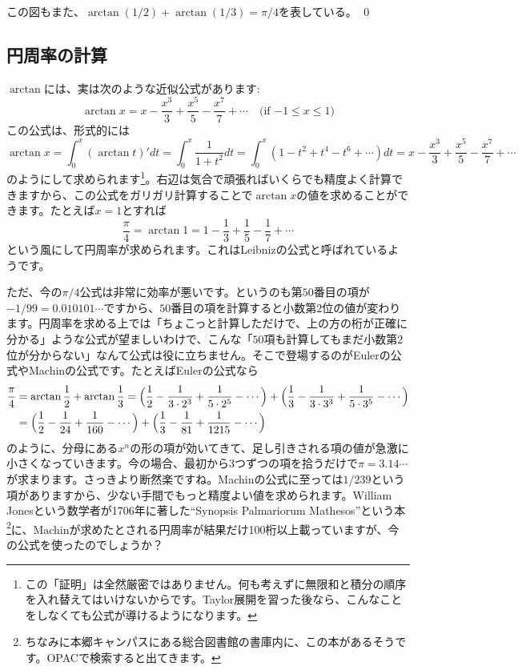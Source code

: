 この図もまた、$\arctan (1/2) + \arctan (1/3) = \pi/4$を表している。 \qed

\subsection{円周率の計算}

$\arctan$には、実は次のような近似公式があります:
\[
\arctan x = x - \frac{x^3}{3} + \frac{x^5}{5} - \frac{x^7}{7} + \cdots \quad \text{(if $-1\leq x\leq 1$)}
\]
この公式は、形式的には
\[
\arctan x = \int_0^x (\arctan t)' dt = \int_0^x \frac{1}{1+t^2} dt = \int_0^x (1-t^2+t^4-t^6+\cdots) dt
= x - \frac{x^3}{3} + \frac{x^5}{5} - \frac{x^7}{7} + \cdots
\]
のようにして求められます\footnote{この「証明」は全然厳密ではありません。何も考えずに無限和と積分の順序を入れ替えてはいけないからです。Taylor展開を習った後なら、こんなことをしなくても公式が導けるようになります。}。右辺は気合で頑張ればいくらでも精度よく計算できますから、この公式をガリガリ計算することで$\arctan x$の値を求めることができます。たとえば$x=1$とすれば
\[
\frac{\pi}{4} = \arctan 1 = 1 - \frac{1}{3} + \frac{1}{5} - \frac{1}{7} + \cdots
\]
という風にして円周率が求められます。これはLeibnizの公式と呼ばれているようです。

ただ、今の$\pi/4$公式は非常に効率が悪いです。というのも第$50$番目の項が$-1/99 = 0.010101\cdots$ですから、$50$番目の項を計算すると小数第$2$位の値が変わります。円周率を求める上では「ちょこっと計算しただけで、上の方の桁が正確に分かる」ような公式が望ましいわけで、こんな「$50$項も計算してもまだ小数第$2$位が分からない」なんて公式は役に立ちません。そこで登場するのがEulerの公式やMachinの公式です。たとえばEulerの公式なら
\begin{align*}
\frac{\pi}{4}
&= \arctan \frac{1}{2} + \arctan \frac{1}{3}
= \Bigl(\frac{1}{2} - \frac{1}{3\cdot 2^3} + \frac{1}{5\cdot 2^5} - \cdots\Bigr)
+ \Bigl(\frac{1}{3} - \frac{1}{3\cdot 3^3} + \frac{1}{5\cdot 3^5} - \cdots\Bigr) \\
&= \Bigl(\frac{1}{2} - \frac{1}{24} + \frac{1}{160} - \cdots\Bigr)
+ \Bigl(\frac{1}{3} - \frac{1}{81} + \frac{1}{1215} - \cdots\Bigr)
\end{align*}
のように、分母にある$x^n$の形の項が効いてきて、足し引きされる項の値が急激に小さくなっていきます。今の場合、最初から$3$つずつの項を拾うだけで$\pi=3.14\cdots$が求まります。さっきより断然楽ですね。Machinの公式に至っては$1/239$という項がありますから、少ない手間でもっと精度よい値を求められます。William Jonesという数学者が1706年に著した``Synopsis Palmariorum Mathesos''という本\footnote{ちなみに本郷キャンパスにある総合図書館の書庫内に、この本があるそうです。OPACで検索すると出てきます。}に、Machinが求めたとされる円周率が結果だけ100桁以上載っていますが、今の公式を使ったのでしょうか？

